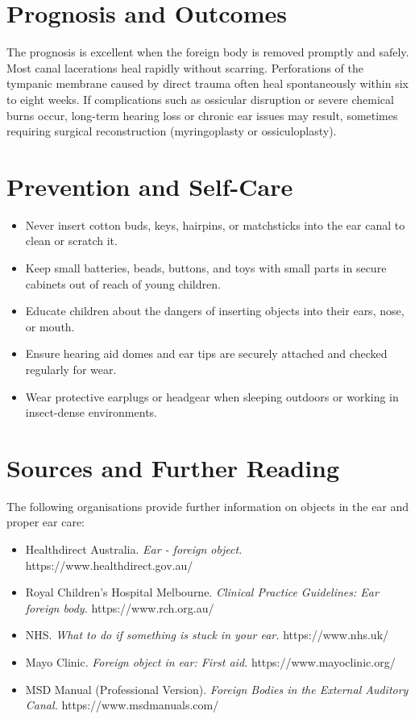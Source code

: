 \section*{Prognosis and Outcomes}
The prognosis is excellent when the foreign body is removed promptly and safely. Most canal lacerations heal rapidly without scarring. Perforations of the tympanic membrane caused by direct trauma often heal spontaneously within six to eight weeks. If complications such as ossicular disruption or severe chemical burns occur, long-term hearing loss or chronic ear issues may result, sometimes requiring surgical reconstruction (myringoplasty or ossiculoplasty).

\section*{Prevention and Self-Care}
\begin{itemize}
    \item Never insert cotton buds, keys, hairpins, or matchsticks into the ear canal to clean or scratch it.
    \item Keep small batteries, beads, buttons, and toys with small parts in secure cabinets out of reach of young children.
    \item Educate children about the dangers of inserting objects into their ears, nose, or mouth.
    \item Ensure hearing aid domes and ear tips are securely attached and checked regularly for wear.
    \item Wear protective earplugs or headgear when sleeping outdoors or working in insect-dense environments.
\end{itemize}

\section*{Sources and Further Reading}
The following organisations provide further information on objects in the ear and proper ear care:
\begin{itemize}
    \item Healthdirect Australia. \textit{Ear - foreign object.} https://www.healthdirect.gov.au/
    \item Royal Children's Hospital Melbourne. \textit{Clinical Practice Guidelines: Ear foreign body.} https://www.rch.org.au/
    \item NHS. \textit{What to do if something is stuck in your ear.} https://www.nhs.uk/
    \item Mayo Clinic. \textit{Foreign object in ear: First aid.} https://www.mayoclinic.org/
    \item MSD Manual (Professional Version). \textit{Foreign Bodies in the External Auditory Canal.} https://www.msdmanuals.com/
\end{itemize}
